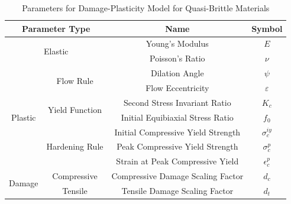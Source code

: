 \begin{table}[!htb]
\centering
\caption{Parameters for Damage-Plasticity Model for Quasi-Brittle Materials}
\label{tab:concParam}
\begin{tabular}{@{}cccc@{}}
\toprule
\multicolumn{2}{c}{Parameter Type}                         & Name                               & Symbol              \\ \midrule
\multicolumn{2}{c}{\multirow{2}{*}{Elastic}}               & Young's Modulus                    & $E$                 \\
\multicolumn{2}{c}{}                                       & Poisson's Ratio                    & $\nu$               \\ \cmidrule(r){1-2}
\multirow{7}{*}{Plastic} & \multirow{2}{*}{Flow Rule}      & Dilation Angle                     & $\psi$              \\
                         &                                 & Flow Eccentricity                  & $\varepsilon$       \\ \cmidrule(lr){2-2}
                         & \multirow{2}{*}{Yield Function} & Second Stress Invariant Ratio      & $K_c$                   \\
                         &                                 & Initial Equibiaxial Stress Ratio   & $f_0$ \\ \cmidrule(lr){2-2}
                         & \multirow{3}{*}{Hardening Rule} & Initial Compressive Yield Strength & $\sigma_c^{iy}$     \\
                         &                                 & Peak Compressive Yield Strength    & $\sigma_c^{p}$      \\
                         &                                 & Strain at Peak Compressive Yield   & $\epsilon_c^{p}$   \\ \cmidrule(r){1-2}
\multirow{2}{*}{Damage}  & Compressive                     & Compressive Damage Scaling Factor  & $d_c$               \\ \cmidrule(lr){2-2}
                         & Tensile                         & Tensile Damage Scaling Factor      & $d_t$               \\ \bottomrule
\end{tabular}
\end{table}